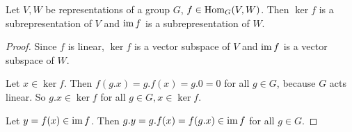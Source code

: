 \begin{lem}\label{lem: ker and im subrepresentations}
 Let $V,W$ be representations of a group $G$, $f \in \operatorname{Hom}_G(V,W)$. Then $\ker f$ is a subrepresentation of $V$ and $\operatorname{im} f$ is a subrepresentation of $W$.
\end{lem}
\begin{proof}
 Since $f$ is linear, $\ker f$ is a vector subspace of $V$ and $\operatorname{im} f$ is a vector subspace of $W$.
 
 Let $x \in \ker f$. Then $f(g.x) = g.f(x) = g.0 = 0$ for all $g \in G$, because $G$ acts linear. So $g.x \in \ker f$ for all $g \in G, x \in \ker f$.
 
 Let $y = f(x) \in \operatorname{im} f$. Then $g.y = g.f(x) = f(g.x) \in \operatorname{im} f$ for all $g \in G$.
\end{proof}


